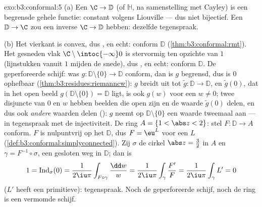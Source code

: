 \begin{solution}{exo:b3:conformal:5}
(a) Een  $\C \to \mathbb D$ (of $\mathbb H$, na
samenstelling met Cayley) is een begrensde gehele functie:
constant volgens Liouville --- dus niet bijectief. Een 
$\mathbb D \to \C$ zou een  inverse $\C \to \mathbb D$
hebben: dezelfde tegenspraak.

(b) Het vierkant is convex, dus , en
echt: conform $\mathbb D$ (\cref{thm:b3:conformal:rmt}). Het
gesneden vlak $\C\setminus\intoc{-\infty}0$ is stervormig ten
opzichte van $1$ (lijnstukken vanuit $1$ mijden de snede), dus
, en echt: conform $\mathbb D$. De
geperforeerde schijf: was $g \colon \mathbb D\setminus\{0\} \to
\mathbb D$ conform, dan is $g$ begrensd, dus is $0$ ophefbaar
(\cref{thm:b3:residues:riemanncw}): $g$ breidt uit tot $\tilde g
\colon \mathbb D \to \mathbb D$, en $\tilde g(0)$, dat in het
open beeld $g(\mathbb D\setminus\{0\}) = \mathbb D$ ligt, is ook
$g(w)$ voor een $w \neq 0$; twee disjuncte  van $0$ en
$w$ hebben beelden die open zijn en de waarde $\tilde g(0)$
delen, en dus ook \emph{andere} waarden delen (): $g$ neemt op $\mathbb D\setminus\{0\}$ een waarde
tweemaal aan --- in tegenspraak met de injectiviteit. De ring $A
= \{1 < \abs z < 2\}$: stel $F \colon \mathbb D \to A$ conform.
$F$ is nulpuntvrij op het  $\mathbb D$,
dus $F = \eu^L$ voor een  $L$
(\cref{def:b3:conformal:simplyconnected}). Zij $\sigma$ de cirkel
$\abs z = \frac32$ in $A$ en $\gamma = F^{-1}\circ\sigma$, een
gesloten weg in $\mathbb D$; dan is
\[
1 = \operatorname{Ind}_\sigma(0)
= \frac1{2\iu\pi}\int_{F\circ\gamma}\frac{\dd w}{w}
= \frac1{2\iu\pi}\int_\gamma\frac{F'}{F}
= \frac1{2\iu\pi}\int_\gamma L' = 0
\]
($L'$ heeft een primitieve): tegenspraak. Noch de geperforeerde
schijf, noch de ring is een vermomde schijf.
\end{solution}

